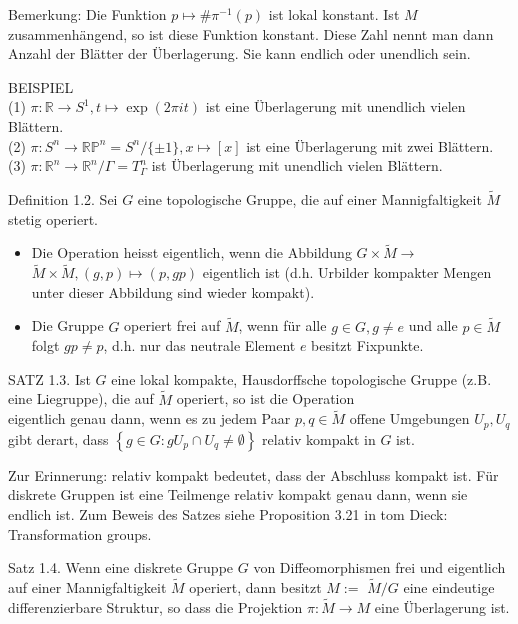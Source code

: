 \documentclass[10pt, letterpaper]{article}
\begin{document}
Bemerkung: Die Funktion $p \mapsto \# \pi^{-1}(p)$ ist lokal konstant. Ist $M$ zusammenhängend, so ist diese Funktion konstant. Diese Zahl nennt man dann Anzahl der Blätter der Überlagerung. Sie kann endlich oder unendlich sein.

BEISPIEL\\
(1) $\pi: \mathbb{R} \rightarrow S^{1}, t \mapsto \exp (2 \pi i t)$ ist eine Überlagerung mit unendlich vielen Blättern.\\
(2) $\pi: S^{n} \rightarrow \mathbb{R} \mathbb{P}^{n}=S^{n} /\{ \pm 1\}, x \mapsto[x]$ ist eine Überlagerung mit zwei Blättern.\\
(3) $\pi: \mathbb{R}^{n} \rightarrow \mathbb{R}^{n} / \Gamma=T_{\Gamma}^{n}$ ist Überlagerung mit unendlich vielen Blättern.

Definition 1.2. Sei $G$ eine topologische Gruppe, die auf einer Mannigfaltigkeit $\tilde{M}$ stetig operiert.

\begin{itemize}
  \item Die Operation heisst eigentlich, wenn die Abbildung $G \times \tilde{M} \rightarrow$ $\tilde{M} \times \tilde{M},(g, p) \mapsto(p, g p)$ eigentlich ist (d.h. Urbilder kompakter Mengen unter dieser Abbildung sind wieder kompakt).
  \item Die Gruppe $G$ operiert frei auf $\tilde{M}$, wenn für alle $g \in G, g \neq e$ und alle $p \in \tilde{M}$ folgt $g p \neq p$, d.h. nur das neutrale Element $e$ besitzt Fixpunkte.
\end{itemize}

SATZ 1.3. Ist $G$ eine lokal kompakte, Hausdorffsche topologische Gruppe (z.B. eine Liegruppe), die auf $\tilde{M}$ operiert, so ist die Operation\\
eigentlich genau dann, wenn es zu jedem Paar $p, q \in \tilde{M}$ offene Umgebungen $U_{p}, U_{q}$ gibt derart, dass $\left\{g \in G: g U_{p} \cap U_{q} \neq \emptyset\right\}$ relativ kompakt in $G$ ist.

Zur Erinnerung: relativ kompakt bedeutet, dass der Abschluss kompakt ist. Für diskrete Gruppen ist eine Teilmenge relativ kompakt genau dann, wenn sie endlich ist. Zum Beweis des Satzes siehe Proposition 3.21 in tom Dieck: Transformation groups.

Satz 1.4. Wenn eine diskrete Gruppe $G$ von Diffeomorphismen frei und eigentlich auf einer Mannigfaltigkeit $\tilde{M}$ operiert, dann besitzt $M:=$ $\tilde{M} / G$ eine eindeutige differenzierbare Struktur, so dass die Projektion $\pi: \tilde{M} \rightarrow M$ eine Überlagerung ist.
\end{document}

